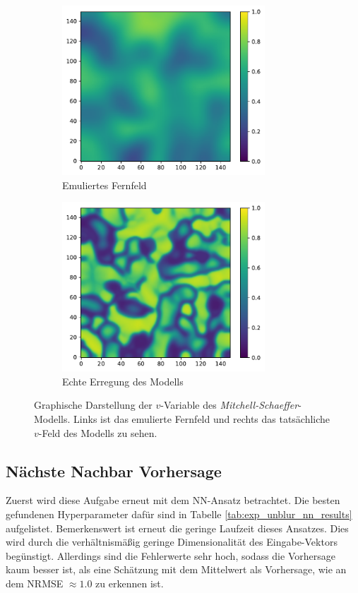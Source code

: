 \begin{figure}[h]
	\centering
	\begin{subfigure}{.5\textwidth}
		\centering
		\includegraphics[height=2.5in]{figures/results/unblur/mitchell_v_blur_blured.pdf}
		\setcapmargin[1cm]{1cm}
		\caption{Emuliertes Fernfeld}
		\label{fig:exp_unblur_mitchell_schaeffer_blurred}
	\end{subfigure}%
	\begin{subfigure}{.5\textwidth}
		\centering
		\includegraphics[height=2.5in]{figures/results/unblur/mitchell_v_blur_orig.pdf}
		\setcapmargin[1cm]{1cm}
  		\caption{Echte Erregung des Modells}
  		\label{fig:exp_unblur_mitchell_schaeffer_orig}
	\end{subfigure}
	\caption{Graphische Darstellung der $v$-Variable des \textit{Mitchell-Schaeffer}-Modells. Links ist das emulierte Fernfeld und rechts das tatsächliche $v$-Feld des Modells zu sehen.}
	\label{fig:exp_unblur_mitchell_schaeffer}
\end{figure} 

\FloatBarrier
\subsection{Nächste Nachbar Vorhersage}
Zuerst wird diese Aufgabe erneut mit dem \textsc{NN}-Ansatz betrachtet. Die besten gefundenen Hyperparameter dafür sind in Tabelle \ref{tab:exp_unblur_nn_results} aufgelistet. Bemerkenswert ist erneut die geringe Laufzeit dieses Ansatzes. Dies wird durch die verhältnismäßig geringe Dimensionalität des Eingabe-Vektors begünstigt. Allerdings sind die Fehlerwerte sehr hoch, sodass die Vorhersage kaum besser ist, als eine Schätzung mit dem Mittelwert als Vorhersage, wie an dem NRMSE $\approx 1.0$ zu erkennen ist.

